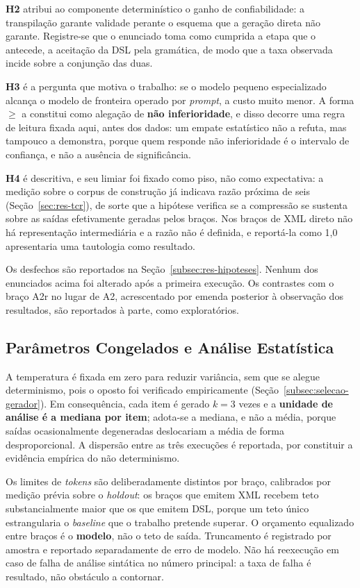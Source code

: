 \textbf{H2} atribui ao componente determinístico o ganho de confiabilidade: a transpilação garante validade perante o esquema que a geração direta não garante. Registre-se que o enunciado toma como cumprida a etapa que o antecede, a aceitação da DSL pela gramática, de modo que a taxa observada incide sobre a conjunção das duas.

\textbf{H3} é a pergunta que motiva o trabalho: se o modelo pequeno especializado alcança o modelo de fronteira operado por \textit{prompt}, a custo muito menor. A forma $\geq$ a constitui como alegação de \textbf{não inferioridade}, e disso decorre uma regra de leitura fixada aqui, antes dos dados: um empate estatístico não a refuta, mas tampouco a demonstra, porque quem responde não inferioridade é o intervalo de confiança, e não a ausência de significância.

\textbf{H4} é descritiva, e seu limiar foi fixado como piso, não como expectativa: a medição sobre o corpus de construção já indicava razão próxima de seis (Seção~\ref{sec:res-tcr}), de sorte que a hipótese verifica se a compressão se sustenta sobre as saídas efetivamente geradas pelos braços. Nos braços de XML direto não há representação intermediária e a razão não é definida, e reportá-la como 1,0 apresentaria uma tautologia como resultado.

Os desfechos são reportados na Seção~\ref{subsec:res-hipoteses}. Nenhum dos enunciados acima foi alterado após a primeira execução. Os contrastes com o braço A2r no lugar de A2, acrescentado por emenda posterior à observação dos resultados, são reportados à parte, como exploratórios.

\subsection{Parâmetros Congelados e Análise Estatística}
\label{subsec:parametros}

A temperatura é fixada em zero para reduzir variância, sem que se alegue determinismo, pois o oposto foi verificado empiricamente (Seção~\ref{subsec:selecao-gerador}). Em consequência, cada item é gerado $k=3$ vezes e a \textbf{unidade de análise é a mediana por item}; adota-se a mediana, e não a média, porque saídas ocasionalmente degeneradas deslocariam a média de forma desproporcional. A dispersão entre as três execuções é reportada, por constituir a evidência empírica do não determinismo.

Os limites de \textit{tokens} são deliberadamente distintos por braço, calibrados por medição prévia sobre o \textit{holdout}: os braços que emitem XML recebem teto substancialmente maior que os que emitem DSL, porque um teto único estrangularia o \textit{baseline} que o trabalho pretende superar. O orçamento equalizado entre braços é o \textbf{modelo}, não o teto de saída. Truncamento é registrado por amostra e reportado separadamente de erro de modelo. Não há reexecução em caso de falha de análise sintática no número principal: a taxa de falha é resultado, não obstáculo a contornar.

